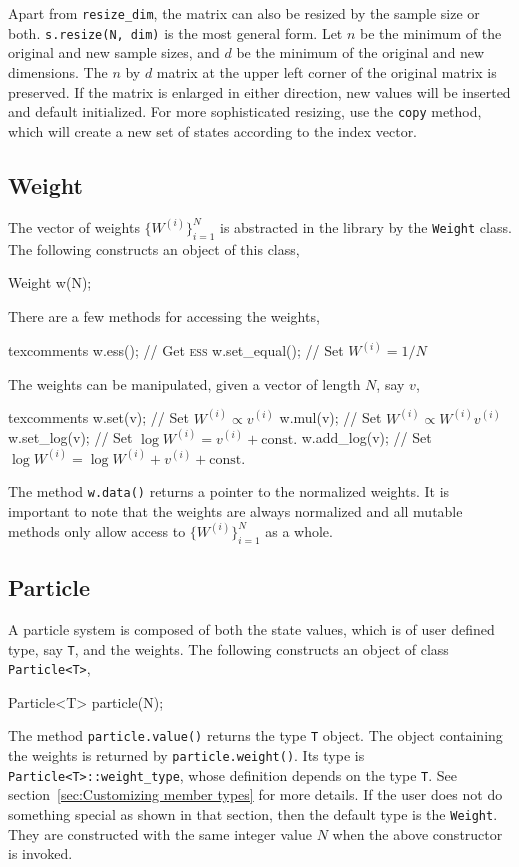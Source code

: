 Apart from \verb|resize_dim|, the matrix can also be resized by the sample size
or both. \verb|s.resize(N, dim)| is the most general form. Let $n$ be the
minimum of the original and new sample sizes, and $d$ be the minimum of the
original and new dimensions. The $n$ by $d$ matrix at the upper left corner of
the original matrix is preserved. If the matrix is enlarged in either
direction, new values will be inserted and default initialized. For more
sophisticated resizing, use the \verb|copy| method, which will create a new set
of states according to the index vector.

\subsection{Weight}
\label{sub:Weight}

The vector of weights $\{W^{(i)}\}_{i=1}^N$ is abstracted in the library by the
\verb|Weight| class. The following constructs an object of this class,
\begin{cppcode}
  Weight w(N);
\end{cppcode}
There are a few methods for accessing the weights,
\begin{cppcode*}{texcomments}
  w.ess();          // Get {\normalfont\textsc{ess}}
  w.set_equal();    // Set $W^{(i)} = 1/N$
\end{cppcode*}
The weights can be manipulated, given a vector of length $N$, say $v$,
\begin{cppcode*}{texcomments}
  w.set(v);         // Set $W^{(i)} \propto v^{(i)}$
  w.mul(v);         // Set $W^{(i)} \propto W^{(i)} v^{(i)}$
  w.set_log(v);     // Set $\log W^{(i)} = v^{(i)} + \text{const.}$
  w.add_log(v);     // Set $\log W^{(i)} = \log W^{(i)} + v^{(i)} + \text{const.}$
\end{cppcode*}
The method \verb|w.data()| returns a pointer to the normalized weights. It is
important to note that the weights are always normalized and all mutable
methods only allow access to $\{W^{(i)}\}_{i=1}^N$ as a whole.

\subsection{Particle}
\label{sub:Particle}

A particle system is composed of both the state values, which is of user
defined type, say \verb|T|, and the weights. The following constructs an object
of class \verb|Particle<T>|,
\begin{cppcode}
  Particle<T> particle(N);
\end{cppcode}
The method \verb|particle.value()| returns the type \verb|T| object. The object
containing the weights is returned by \verb|particle.weight()|. Its type is
\verb|Particle<T>::weight_type|, whose definition depends on the type \verb|T|.
See section~\ref{sec:Customizing member types} for more details. If the user
does not do something special as shown in that section, then the default type
is the \verb|Weight|. They are constructed with the same integer value $N$ when
the above constructor is invoked.

